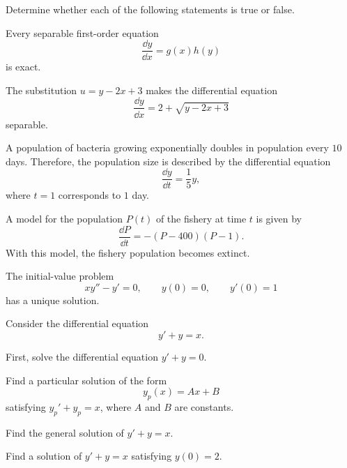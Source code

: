 \documentclass[11pt,oneside]{article}
\begin{document}
\begin{problem}
Determine whether each of the following statements is true or false.
\begin{problemchoices}
\item Every separable first-order equation
\[
\frac{\dd y}{\dd x}=g(x)h(y)
\]
is exact.
\item The substitution $u=y-2x+3$ makes the differential equation
\[
\frac{\dd y}{\dd x}=2+\sqrt{y-2x+3}
\]
separable.
\item A population of bacteria growing exponentially doubles in population every $10$ days. Therefore, the population size is described by the differential equation
\[
\frac{\dd y}{\dd t}=\frac15y,
\]
where $t=1$ corresponds to $1$ day.
\item A model for the population $P(t)$ of the fishery at time $t$ is given by
\[
\frac{\dd P}{\dd t}=-(P-400)(P-1).
\]
With this model, the fishery population becomes extinct.
\item The initial-value problem
\[
xy''-y'=0,
\qquad
y(0)=0,
\qquad
y'(0)=1
\]
has a unique solution.
\end{problemchoices}
\end{problem}

\begin{problem}
Consider the differential equation
\[
y'+y=x.
\]
\begin{problemsubparts}
\item First, solve the differential equation $y'+y=0$.
\item Find a particular solution of the form
\[
y_p(x)=Ax+B
\]
satisfying $y_p'+y_p=x$, where $A$ and $B$ are constants.
\item Find the general solution of $y'+y=x$.
\item Find a solution of $y'+y=x$ satisfying $y(0)=2$.
\end{problemsubparts}
\end{problem}
\end{document}
